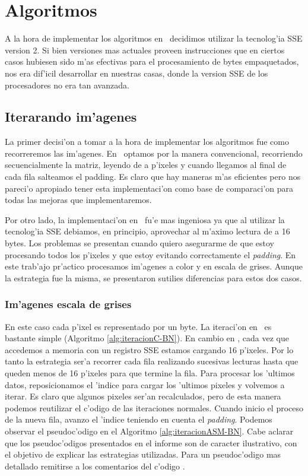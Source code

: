 \section{Algoritmos}
\label{sec:algoritmos}

A la hora de implementar los algoritmos en \ass\ decidimos utilizar la tecnolog'ia SSE version 2. Si bien versiones mas actuales proveen instrucciones que en ciertos casos hubiesen sido m'as efectivas para el procesamiento de bytes empaquetados, nos era dif'icil desarrollar en nuestras casas, donde la version SSE de los procesadores no era tan avanzada.

\subsection{Iterarando im'agenes}
\label{sec:ciclos}
La primer decisi'on a tomar a la hora de implementar los algoritmos fue como recorreremos las im'agenes. En \C\ optamos por la manera convencional, recorriendo secuencialmente la matriz, leyendo de a p'ixeles y cuando llegamos al final de cada fila salteamos el padding. Es claro que hay maneras m'as eficientes pero nos pareci'o apropiado tener esta implementaci'on como base de comparaci'on para todas las mejoras que implementaremos. 

Por otro lado, la implementaci'on en \ass\ fu'e mas ingeniosa ya que al utilizar la tecnolog'ia SSE debiamos, en principio, aprovechar al m'aximo lectura de a 16 bytes. Los problemas se presentan cuando quiero asegurarme de que estoy procesando todos los p'ixeles y que estoy evitando correctamente el \textit{padding}. En este trab'ajo pr'actico procesamos im'agenes a color y en escala de grises. Aunque la estrategia fue la misma, se presentaron sutilies diferencias para estos dos casos. 


\subsubsection{Im'agenes escala de grises}
En este caso cada p'ixel es representado por un byte. La iteraci'on en \C\ es bastante simple (Algoritmo \ref{alg:iteracionC-BN}). En cambio en \ass, cada vez que accedemos a memoria con un registro SSE estamos cargando 16 p'ixeles. Por lo tanto la estrategia ser'a recorrer cada fila realizando sucesivas lecturas hasta que queden menos de 16 p'ixeles para que termine la fila. Para procesar los 'ultimos datos, reposicionamos el 'indice para cargar los 'ultimos pixeles y volvemos a iterar. Es claro que algunos pixeles ser'an recalculados, pero de esta manera podemos reutilizar el c'odigo de las iteraciones normales. Cuando inicio el proceso de la nueva fila, avanzo el 'indice teniendo en cuenta el \textit{padding}. Podemos observar el pseudoc'odigo en el Algoritmo \ref{alg:iteracionASM-BN}. Cabe aclarar que los pseudoc'odigos presentados en el informe son de caracter ilustrativo, con el objetivo de explicar las estrategias utilizadas. Para un pseudoc'odigo mas detallado remitirse a los comentarios del c'odigo \ass.

